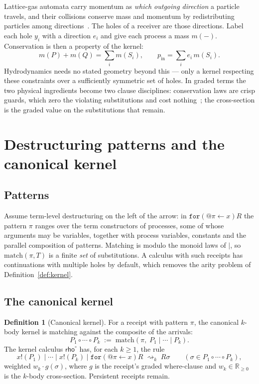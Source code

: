 \documentclass[11pt,a4paper]{article}
\theoremstyle{plain}
\theoremstyle{definition}
\newtheorem{definition}[theorem]{Definition}
\theoremstyle{remark}
\newcommand{\krho}{\textsf{rho}^{\circ}}
\newcommand{\Rnn}{\mathbb{R}_{\geq 0}}
\newcommand{\red}{\rightsquigarrow}
\newcommand{\coll}{\circ}
\newcommand{\match}{\mathrm{match}}
\newcommand{\code}[1]{\texttt{#1}}
\begin{document}
Lattice-gas automata carry momentum as \emph{which outgoing direction} a
particle travels, and their collisions conserve mass and momentum by
redistributing particles among directions~\cite{FHP}. The holes of a receiver
are those directions. Label each hole $y_i$ with a direction $e_i$ and give each
process a mass $m(-)$. Conservation is then a property of the kernel:
\[
m(P) + m(Q) = \textstyle\sum_i m(S_i),
\qquad
p_{\mathrm{in}} = \textstyle\sum_i e_i\, m(S_i).
\]
Hydrodynamics needs no stated geometry beyond this --- only a kernel respecting
these constraints over a sufficiently symmetric set of holes. In graded
terms the two physical ingredients become two clause disciplines: conservation
laws are crisp guards, which zero the violating substitutions and cost
nothing~\cite{CF}; the cross-section is the graded value on the substitutions
that remain.

\section{Destructuring patterns and the canonical kernel}\label{sec:patterns}

\subsection{Patterns}

Assume term-level destructuring on the left of the arrow: in
$\code{for}(@\pi\leftarrow x)R$ the pattern $\pi$ ranges over the term
constructors of processes, some of whose arguments may be variables, together
with process variables, constants and the parallel composition of patterns.
Matching is modulo the monoid laws of $\mid$, so $\match(\pi,T)$ is a finite
\emph{set} of substitutions. A calculus with such receipts has continuations
with multiple holes by default, which removes the arity problem of
Definition~\ref{def:kernel}.

\subsection{The canonical kernel}

\begin{definition}[Canonical kernel]\label{def:canonical}
For a receipt with pattern $\pi$, the canonical $k$-body kernel is matching
against the composite of the arrivals:
\[
P_1\coll\cdots\coll P_k \;:=\; \match(\pi,\; P_1\mid\cdots\mid P_k).
\]
The kernel calculus $\krho$ has, for each $k\geq1$, the rule
\[
x!(P_1)\mid\cdots\mid x!(P_k)\mid \code{for}(@\pi\leftarrow x)R \;\red_k\; R\sigma
\qquad(\sigma\in P_1\coll\cdots\coll P_k),
\]
weighted $w_k\cdot g(\sigma)$, where $g$ is the receipt's graded where-clause
and $w_k\in\Rnn$ is the $k$-body cross-section. Persistent receipts remain.
\end{definition}
\end{document}
